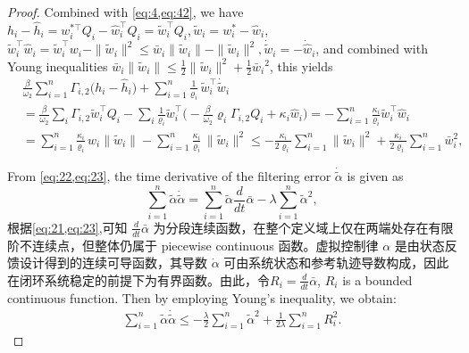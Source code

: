 \documentclass[pdflatex,sn-mathphys-num]{sn-jnl}%
\theoremstyle{thmstyleone}%
\theoremstyle{thmstyletwo}%
\theoremstyle{thmstylethree}%
\begin{document}
\begin{proof}
Combined with \cref{eq:4,eq:42}, we have $h_i-\hat h_i=w_i^{*\top}Q_i-\hat w_i^{\top}Q_i
=\tilde w_i^{\!\top}Q_i, \tilde w_i=w_i^{*}-\hat w_i$, $\tilde w_i^\top\hat w_i   =\tilde w_i^\top w_i- \|\tilde w_i\|^2
\le \bar w_i\|\tilde w_i\| - \|\tilde w_i\|^2, \dot{\tilde w}_i=-\dot{\hat w}_i$, and combined with Young inequalities $\bar w_i\|\tilde w_i\| \le \frac12\|\tilde w_i\|^{2}
	+\frac12{\bar w_i}^{2}$, this yields
	\begin{equation}\label{eq:47}
		\begin{aligned}
				&\frac{\beta}{\omega_{2}}
				  \sum_{i=1}^{n}
					\varGamma_{i,2}\bigl(h_i-\hat h_i\bigr)
				 +\sum_{i=1}^{n}
					\frac{1}{\varrho_i}\,\tilde w_i^{\top}\dot{\tilde w}_i \\
					&= \frac{\beta}{\omega_{2}} \sum_{i}
					\varGamma_{i,2}\tilde w_i^{\top}Q_i
				 -\sum_{i}
					\frac{1}{\varrho_i}\tilde w_i^{\top}
					\bigl(
						-\frac{\beta}{\omega_{2}}\varrho_i
						 \varGamma_{i,2}Q_i
						+\kappa_i\hat w_i
					\bigr)                                                    = -\sum_{i=1}^{n}\frac{\kappa_i}{\varrho_i}\tilde w_i^{\top}\hat w_i       \\
					&  =\sum_{i=1}^n \frac{\kappa_i}{\varrho_i}\,w_i\|\tilde w_i\|
				- \sum_{i=1}^n \frac{\kappa_i}{\varrho_i}\,\|\tilde w_i\|^2 \le
				- \frac{\kappa_i}{2\varrho_i}\sum_{i=1}^n \|\tilde w_i\|^2+\frac{\kappa_i}{2\varrho_i}\sum_{i=1}^n \bar w_i^2,		
			\end{aligned}
		\end{equation}

From \cref{eq:22,eq:23}, the time derivative of the filtering error $\dot{\tilde{\alpha}}$ is given as
\begin{equation}\label{eq:48}
	\sum_{i=1}^{n}{\tilde{\alpha}}\dot{\tilde{\alpha}}= \sum_{i=1}^{n}{\tilde{\alpha}} \frac{d}{dt}\bar{\alpha}-\lambda\sum_{i=1}^{n}{\tilde{\alpha}}^2,
\end{equation}
根据\cref{eq:21,eq:23},可知 $\frac{d}{dt} \bar{\alpha}$ 为分段连续函数，在整个定义域上仅在两端处存在有限阶不连续点，但整体仍属于 piecewise continuous 函数。虚拟控制律 $\alpha$ 是由状态反馈设计得到的连续可导函数，其导数 $\dot{\alpha}$ 可由系统状态和参考轨迹导数构成，因此在闭环系统稳定的前提下为有界函数。由此，令$R_i=\frac{d}{dt} \bar{\alpha}$, $R_i$ is a bounded continuous function.
Then by employing Young's inequality, we obtain:
\begin{equation}\label{eq:49}
	\begin{aligned}
		\sum_{i=1}^{n}{\tilde{\alpha}}\dot{\tilde{\alpha}}\leq -\frac{\lambda}{2} \sum_{i=1}^{n} {\tilde{\alpha}}^{2} + \frac{1}{2\lambda} \sum_{i=1}^{n}R_{i}^2. 
	\end{aligned}
\end{equation}






\end{proof}
\end{document}

